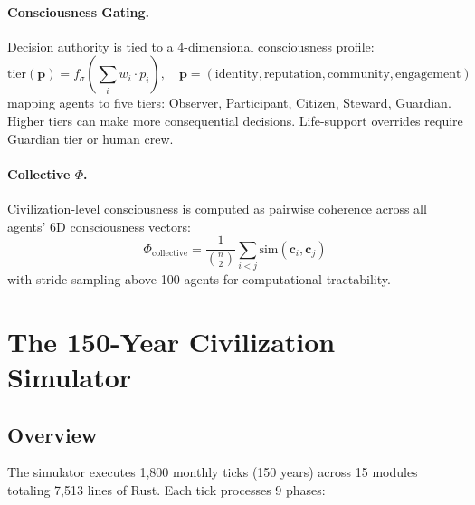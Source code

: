 \documentclass[12pt,a4paper]{article}
\begin{document}
\paragraph{Consciousness Gating.} Decision authority is tied to a 4-dimensional consciousness profile:
\begin{equation}
    \text{tier}(\mathbf{p}) = f_\sigma\left(\sum_i w_i \cdot p_i\right), \quad \mathbf{p} = (\text{identity}, \text{reputation}, \text{community}, \text{engagement})
\end{equation}
mapping agents to five tiers: Observer, Participant, Citizen, Steward, Guardian. Higher tiers can make more consequential decisions. Life-support overrides require Guardian tier or human crew.

\paragraph{Collective $\Phi$.} Civilization-level consciousness is computed as pairwise coherence across all agents' 6D consciousness vectors:
\begin{equation}
    \Phi_\text{collective} = \frac{1}{\binom{n}{2}} \sum_{i<j} \text{sim}(\mathbf{c}_i, \mathbf{c}_j)
\end{equation}
with stride-sampling above 100 agents for computational tractability.


\section{The 150-Year Civilization Simulator}
\label{sec:simulator}

\subsection{Overview}

The simulator executes 1,800 monthly ticks (150 years) across 15 modules totaling 7,513 lines of Rust. Each tick processes 9 phases:
\end{document}
